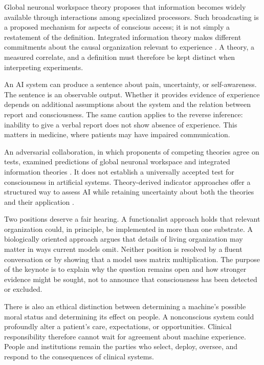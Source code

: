 \documentclass[11pt,a4paper]{article}
\begin{document}
Global neuronal workspace theory proposes that information becomes widely available through interactions among specialized processors. Such broadcasting is a proposed mechanism for aspects of conscious access; it is not simply a restatement of the definition. Integrated information theory makes different commitments about the causal organization relevant to experience \citep{sethbayne2022}. A theory, a measured correlate, and a definition must therefore be kept distinct when interpreting experiments.

An AI system can produce a sentence about pain, uncertainty, or self-awareness. The sentence is an observable output. Whether it provides evidence of experience depends on additional assumptions about the system and the relation between report and consciousness. The same caution applies to the reverse inference: inability to give a verbal report does not show absence of experience. This matters in medicine, where patients may have impaired communication.

An adversarial collaboration, in which proponents of competing theories agree on tests, examined predictions of global neuronal workspace and integrated information theories \citep{cogitate2025}. It does not establish a universally accepted test for consciousness in artificial systems. Theory-derived indicator approaches offer a structured way to assess AI while retaining uncertainty about both the theories and their application \citep{butlin2025}.

Two positions deserve a fair hearing. A functionalist approach holds that relevant organization could, in principle, be implemented in more than one substrate. A biologically oriented approach argues that details of living organization may matter in ways current models omit. Neither position is resolved by a fluent conversation or by showing that a model uses matrix multiplication. The purpose of the keynote is to explain why the question remains open and how stronger evidence might be sought, not to announce that consciousness has been detected or excluded.

There is also an ethical distinction between determining a machine's possible moral status and determining its effect on people. A nonconscious system could profoundly alter a patient's care, expectations, or opportunities. Clinical responsibility therefore cannot wait for agreement about machine experience. People and institutions remain the parties who select, deploy, oversee, and respond to the consequences of clinical systems.
\end{document}
